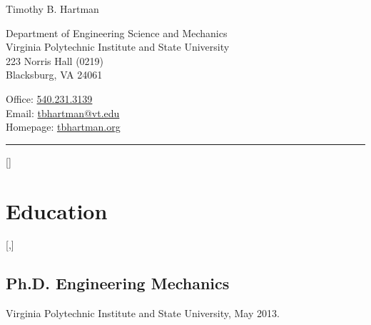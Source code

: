 \documentclass[10pt,letterpaper]{article}
\newcommand\name{Timothy B. Hartman}
\def\vpisu{Virginia Polytechnic Institute and State University}
\begin{document}
{\huge \name}

\bigskip

\begin{minipage}[t]{0.5\textwidth}
  Department of Engineering Science and Mechanics \\
  \vpisu \\
  223 Norris Hall (0219) \\
  Blacksburg, VA 24061
\end{minipage}
\begin{minipage}[t]{0.5\textwidth}
  \raggedleft
  Office: \href{tel:5402313139}{540.231.3139} \\
\newcommand{\email}{tbhartman@vt.edu}
  Email: \href{mailto:\email}{\email} \\
  Homepage: \href{http://tbhartman.org}{tbhartman.org}
\end{minipage}

\vspace{12pt}

\rule{\textwidth}{1pt}

\titlespacing{\section}{0pt}{\baselineskip}{\baselineskip}{}
\titleformat{\section}[hang]{\Large}{}{1em}{}[]

\section*{Education}

\titleformat{\subsection}[runin]{\bf}{}{0pt}{}[,]

\subsection*{Ph.D. Engineering Mechanics}
\vpisu, May 2013.
\end{document}
